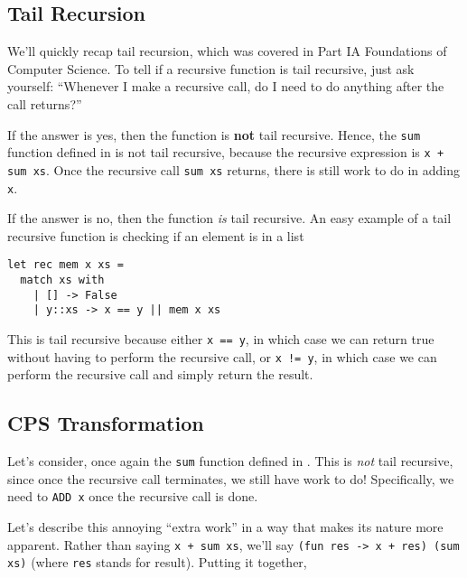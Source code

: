 \subsection{Tail Recursion}\label{subsection:tailrecursion}
We'll quickly recap tail recursion, which was covered in {\sffamily Part IA Foundations of Computer Science}. To tell if a recursive function is tail recursive, just ask yourself: “Whenever I make a recursive call, do I need to do anything after the call returns?”

If the answer is yes, then the function is \textbf{not} tail recursive. Hence, the \texttt{sum} function defined in  is not tail recursive, because the recursive expression is \texttt{x + sum xs}. Once the recursive call \texttt{sum xs} returns, there is still work to do in adding \texttt{x}.

If the answer is no, then the function \emph{is} tail recursive. An easy example of a tail recursive function is checking if an element is in a list

\begin{code}
\label{code:sum-cps-ocaml}
\begin{verbatim}
let rec mem x xs = 
  match xs with
    | [] -> False
    | y::xs -> x == y || mem x xs 
\end{verbatim}
\end{code}

This is tail recursive because either \texttt{x == y}, in which case we can return true without having to perform the recursive call, or \texttt{x != y}, in which case we can perform the recursive call and simply return the result. 

\subsection{CPS Transformation}\label{subsection:cps-transform}
Let's consider, once again the \texttt{sum} function defined in . This is \emph{not} tail recursive, since once the recursive call terminates, we still have work to do! Specifically, we need to \texttt{ADD x} once the recursive call is done. 

Let's describe this annoying ``extra work'' in a way that makes its nature more apparent. Rather than saying \texttt{x + sum xs}, we'll say \texttt{(fun res -> x + res) (sum xs)} (where \texttt{res} stands for result). Putting it together, 

